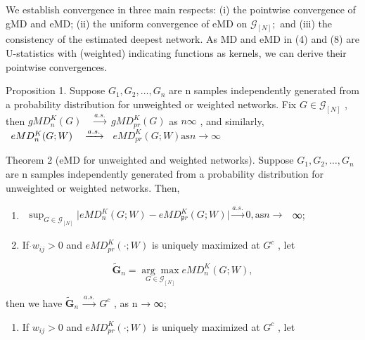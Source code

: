 \documentclass[
  10
]{article}
\providecommand{\tightlist}{%
  \setlength{\itemsep}{0pt}\setlength{\parskip}{0pt}}
\begin{document}
We establish convergence in three main respects: (i) the pointwise
convergence of gMD and eMD; (ii) the uniform convergence of eMD on
\(\mathcal { G } _ { [ N ] } ;\) and (iii) the consistency of the
estimated deepest network. As MD and eMD in (4) and (8) are U-statistics
with (weighted) indicating functions as kernels, we can derive their
pointwise convergences.

Proposition 1. Suppose \(G _ { 1 } , G _ { 2 } , \ldots , G _ { n }\)
are n samples independently generated from a probability distribution
for unweighted or weighted networks. Fix
\(G \in \mathcal G _ { [ N ] }\) , then
\(g M D _ { n } ^ { K } ( G ) \quad { \xrightarrow { a . s . } }\)
\(g M D _ { p r } ^ { K } ( G )\) as \(n  \infty\) , and similarly,
\(\begin{array} { r l } { e M D _ { n } ^ { K } ( G ; W ) } & { { } \xrightarrow { a . s . } } \end{array}\)
\(e M D _ { p r } ^ { K } ( G ; W ) \mathrm { a s } n \to \infty\)

Theorem 2 (eMD for unweighted and weighted networks). Suppose
\(G _ { 1 } , G _ { 2 } , \ldots , G _ { n }\) are n samples
independently generated from a probability distribution for unweighted
or weighted networks. Then,

\begin{enumerate}
\def\labelenumi{(\alph{enumi})}
\item
  \(\begin{array} { r } { \operatorname* { s u p } _ { G \in \mathcal { G } _ { [ N ] } } \vert e M D _ { n } ^ { K } ( G ; W ) - e M D _ { \mathfrak { p } r } ^ { K } ( G ; W ) \vert \overset { a . s . } { \longrightarrow } 0 , \mathrm { a s } n \longrightarrow } \end{array}\)
  ∞;
\item
  If \(\dot { } w _ { i j } > 0\) and
  \(e M D _ { p r } ^ { K } ( \cdot ; W )\) is uniquely maximized at
  \(G ^ { c }\) , let
\end{enumerate}

\[
\widetilde {\mathbf {G}} _ {n} = \underset {G \in \mathcal {G} _ {[ N ]}} {\arg \max} e M D _ {n} ^ {K} (G; W),
\]

then we have
\({ \widetilde { \mathbf { G } } } _ { n } \ { \xrightarrow { a . s . } } \ G ^ { c }\)
, as n → ∞;

\begin{enumerate}
\def\labelenumi{(\alph{enumi})}
\setcounter{enumi}{2}
\tightlist
\item
  If \(w _ { i j } > 0\) and \(e M D _ { p r } ^ { K } ( \cdot ; W )\)
  is uniquely maximized at \(G ^ { c }\) , let
\end{enumerate}
\end{document}
